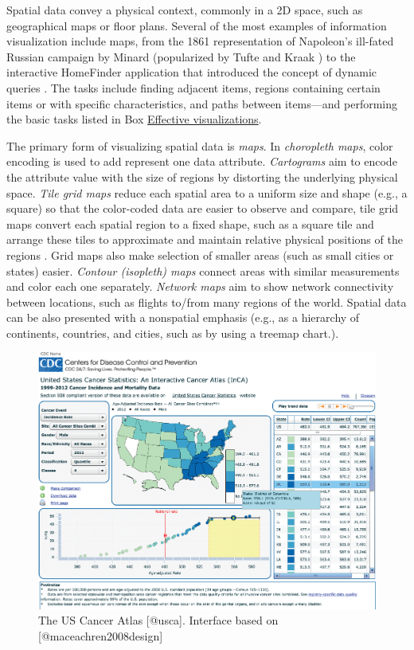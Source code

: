 \documentclass[]{krantz}
\begin{document}
Spatial data convey a physical context, commonly in a 2D space, such as
geographical maps or floor plans. Several of the most examples of
information visualization include maps, from the 1861 representation of
Napoleon's ill-fated Russian campaign by Minard (popularized by Tufte
\citet{edward2001visual} and Kraak \citet{Kraak2014}) to the interactive
HomeFinder application that introduced the concept of dynamic queries
\citep{ahlberg1992dynamic}. The tasks include finding adjacent items,
regions containing certain items or with specific characteristics, and
paths between items---and performing the basic tasks listed in Box
\protect\hyperlink{box:viz1}{Effective visualizations}.

The primary form of visualizing spatial data is \emph{maps}. In
\emph{choropleth maps}, color encoding is used to add represent one data
attribute. \emph{Cartograms} aim to encode the attribute value with the
size of regions by distorting the underlying physical space. \emph{Tile
grid maps} reduce each spatial area to a uniform size and shape (e.g., a
square) so that the color-coded data are easier to observe and compare,
tile grid maps convert each spatial region to a fixed shape, such as a
square tile and arrange these tiles to approximate and maintain relative
physical positions of the regions \citep{DeBelius2015, ProtoVis2015}.
Grid maps also make selection of smaller areas (such as small cities or
states) easier. \emph{Contour (isopleth) maps} connect areas with
similar measurements and color each one separately. \emph{Network maps}
aim to show network connectivity between locations, such as flights
to/from many regions of the world. Spatial data can be also presented
with a nonspatial emphasis (e.g., as a hierarchy of continents,
countries, and cities, such as by using a treemap chart.).

\begin{figure}

{\centering \includegraphics[width=0.9\linewidth]{ChapterViz/figures/fig9-5} 

}

\caption{The US Cancer Atlas [@usca]. Interface based on [@maceachren2008design]}\label{fig:fig9-5}
\end{figure}
\end{document}
